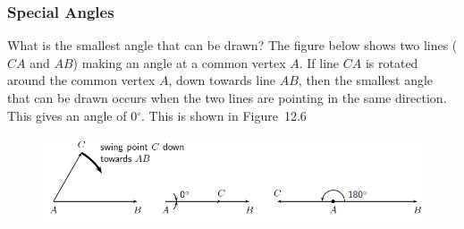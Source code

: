     \addtocounter{footnote}{-0}
    
          \par 
          
          

        
      
      \label{m39370*uid17}
            \subsubsection{ Special Angles}
            \nopagebreak
            
        
        \label{m39370*id314513}What is the smallest angle that can be drawn? The figure below shows two lines (\begin{math}CA\end{math} and \begin{math}AB\end{math}) making an angle at a common vertex \begin{math}A\end{math}. If line \begin{math}CA\end{math} is rotated around the common vertex \begin{math}A\end{math}, down towards line \begin{math}AB\end{math}, then the smallest angle that can be drawn occurs when the two lines are pointing in the same direction. This gives an angle of 0\begin{math}{}^{\circ }\end{math}. This is shown in Figure~12.6\par 
        \label{m39370*id314590}
    \setcounter{subfigure}{0}


	\begin{figure}[H] %
    \begin{center}
    \label{m39370*id314593!!!underscore!!!media}\label{m39370*id314593!!!underscore!!!printimage}\includegraphics[width=.8\columnwidth]{col11306.imgs/m39370_MG10C13_006.png} %
        
      \vspace{2pt}
    \vspace{.1in}
    
    \end{center}

 \end{figure}   

